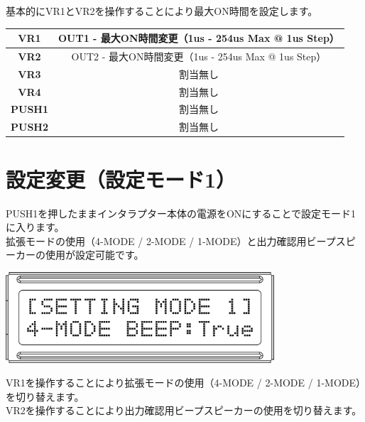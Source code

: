 \documentclass[a4paper,11pt]{jsarticle}
\begin{document}
基本的にVR1とVR2を操作することにより最大ON時間を設定します。

\vspace*{5mm}

\begin{table}[htbp]
\begin{center}
\begin{tabular}{ | c | c | }
\hline
\textbf{VR1} & OUT1 - 最大ON時間変更（1us - 254us Max @ 1us Step） \\\hline
\textbf{VR2} & OUT2 - 最大ON時間変更（1us - 254us Max @ 1us Step） \\\hline
\textbf{VR3} & 割当無し \\\hline
\textbf{VR4} & 割当無し \\\hline
\textbf{PUSH1} & 割当無し \\\hline
\textbf{PUSH2} & 割当無し \\\hline
\end{tabular}
\end{center}
\end{table}



\clearpage

\section{設定変更（設定モード1）}

PUSH1を押したままインタラプター本体の電源をONにすることで設定モード1に入ります。 \\
拡張モードの使用（4-MODE / 2-MODE / 1-MODE）と出力確認用ビープスピーカーの使用が設定可能です。

\vspace*{10mm}
\begin{center}
\includegraphics[width=100mm]{image/Arduino_Interrupter_v1_LCD_SET_1.png}
\end{center}
\vspace*{10mm}

VR1を操作することにより拡張モードの使用（4-MODE / 2-MODE / 1-MODE）を切り替えます。 \\
VR2を操作することにより出力確認用ビープスピーカーの使用を切り替えます。
\end{document}
